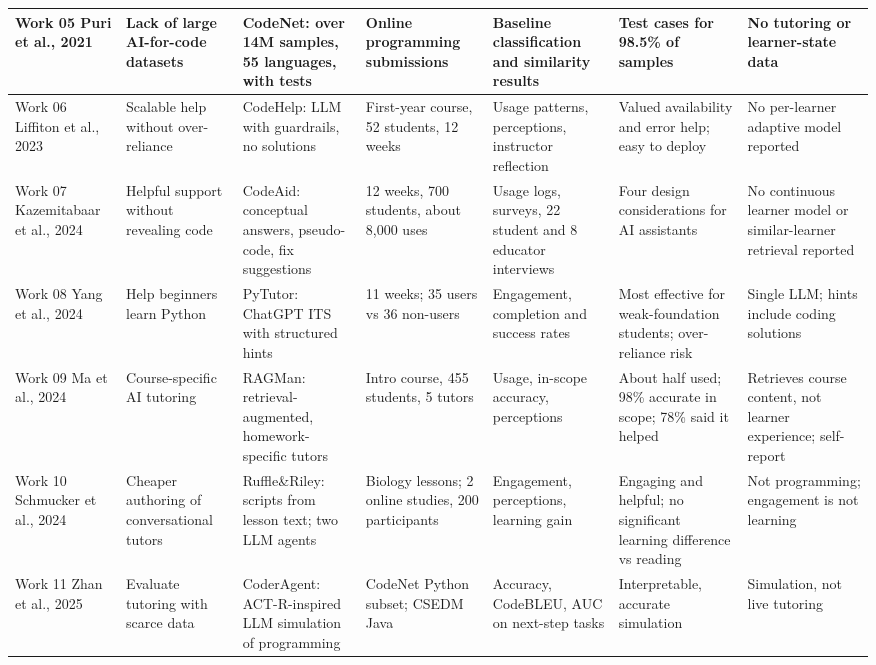 \begin{landscape}
\begin{longtable}{|R{2.2cm}|R{2.6cm}|R{3.5cm}|R{2.7cm}|R{3.0cm}|R{2.9cm}|R{3.3cm}|}
Work 05 \cite{puri2021} Puri et al., 2021 & Lack of large AI-for-code datasets & CodeNet: over 14M samples, 55 languages, with tests & Online programming submissions & Baseline classification and similarity results & Test cases for 98.5\% of samples & No tutoring or learner-state data\\\hline
Work 06 \cite{liffiton2023} Liffiton et al., 2023 & Scalable help without over-reliance & CodeHelp: LLM with guardrails, no solutions & First-year course, 52 students, 12 weeks & Usage patterns, perceptions, instructor reflection & Valued availability and error help; easy to deploy & No per-learner adaptive model reported\\\hline
Work 07 \cite{kazemitabaar2024} Kazemitabaar et al., 2024 & Helpful support without revealing code & CodeAid: conceptual answers, pseudo-code, fix suggestions & 12 weeks, 700 students, about 8,000 uses & Usage logs, surveys, 22 student and 8 educator interviews & Four design considerations for AI assistants & No continuous learner model or similar-learner retrieval reported\\\hline
Work 08 \cite{yang2024} Yang et al., 2024 & Help beginners learn Python & PyTutor: ChatGPT ITS with structured hints & 11 weeks; 35 users vs 36 non-users & Engagement, completion and success rates & Most effective for weak-foundation students; over-reliance risk & Single LLM; hints include coding solutions\\\hline
Work 09 \cite{ma2024} Ma et al., 2024 & Course-specific AI tutoring & RAGMan: retrieval-augmented, homework-specific tutors & Intro course, 455 students, 5 tutors & Usage, in-scope accuracy, perceptions & About half used; 98\% accurate in scope; 78\% said it helped & Retrieves course content, not learner experience; self-report\\\hline
Work 10 \cite{schmucker2024} Schmucker et al., 2024 & Cheaper authoring of conversational tutors & Ruffle\&Riley: scripts from lesson text; two LLM agents & Biology lessons; 2 online studies, 200 participants & Engagement, perceptions, learning gain & Engaging and helpful; no significant learning difference vs reading & Not programming; engagement is not learning\\\hline
Work 11 \cite{zhan2025} Zhan et al., 2025 & Evaluate tutoring with scarce data & CoderAgent: ACT-R-inspired LLM simulation of programming & CodeNet Python subset; CSEDM Java & Accuracy, CodeBLEU, AUC on next-step tasks & Interpretable, accurate simulation & Simulation, not live tutoring\\\hline

\end{longtable}
\end{landscape}
